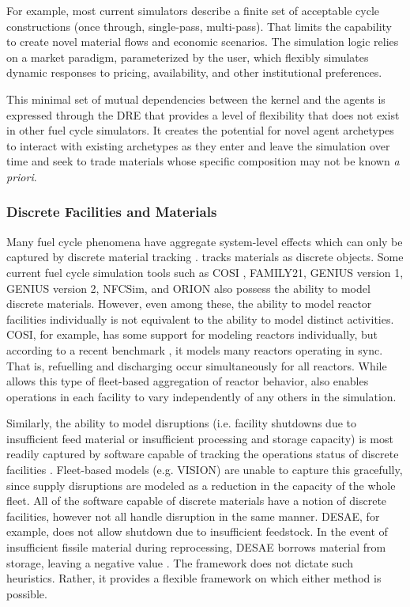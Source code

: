 For example, most current simulators describe a finite set of acceptable cycle
constructions (once through, single-pass, multi-pass). That limits the
capability to create novel material flows and economic scenarios. The \Cyclus
simulation logic relies on a market paradigm, parameterized by the user, which
flexibly simulates dynamic responses to pricing, availability, and other
institutional preferences.

This minimal set of mutual dependencies between the kernel and the agents is
expressed through the \gls{DRE} that provides a level of flexibility that does
not exist in other fuel cycle simulators.  It creates the potential for novel
agent archetypes to interact with existing archetypes as they enter and leave
the simulation over time and seek to trade materials whose specific
composition may not be known \textit{a priori}.

\subsubsection{Discrete Facilities and Materials}

Many fuel cycle phenomena have aggregate system-level effects which can only be
captured by discrete material tracking \cite{huff_next_2010}.  \Cyclus
tracks materials as discrete objects. Some current fuel cycle simulation tools
such as \gls{COSI}
\cite{mccarthy_benchmark_2012,grasso_nea-wpfc/fcts_2009,guerin_benchmark_2009},
FAMILY21\cite{mccarthy_benchmark_2012},
\gls{GENIUS} version 1, \gls{GENIUS} version 2, \gls{NFCSim}, and ORION also
possess the ability to model discrete materials. However, even among these, the ability to model reactor facilities individually is not equivalent to the ability to model distinct activities. \gls{COSI}, for example,
has some support for modeling reactors individually, but according to a recent
benchmark \cite{boucher_benchmark_2012}, it models many reactors operating in sync. That is, refuelling and discharging occur simultaneously for all reactors.
While \Cyclus allows this type of fleet-based aggregation of reactor behavior, \Cyclus also enables operations in each facility to vary independently of any others in the simulation.

Similarly, the ability to model disruptions (i.e. facility shutdowns due to
insufficient feed material or insufficient processing and storage capacity) is
most readily captured by software capable of tracking the operations status of
discrete facilities \cite{huff_next_2010}.  Fleet-based models (e.g.
\gls{VISION}) are unable to capture this gracefully, since supply disruptions
are modeled as a reduction in the capacity of the whole fleet.  All of the
software capable of discrete materials have a notion of discrete facilities,
however not all handle disruption in the same manner. \gls{DESAE}, for example,
does not allow shutdown due to insufficient feedstock. In the event of
insufficient fissile material during reprocessing, \gls{DESAE} borrows material
from storage, leaving a negative value \cite{mccarthy_benchmark_2012}.  The
\Cyclus framework does not dictate such heuristics. Rather, it provides a
flexible framework on which either method is possible.

